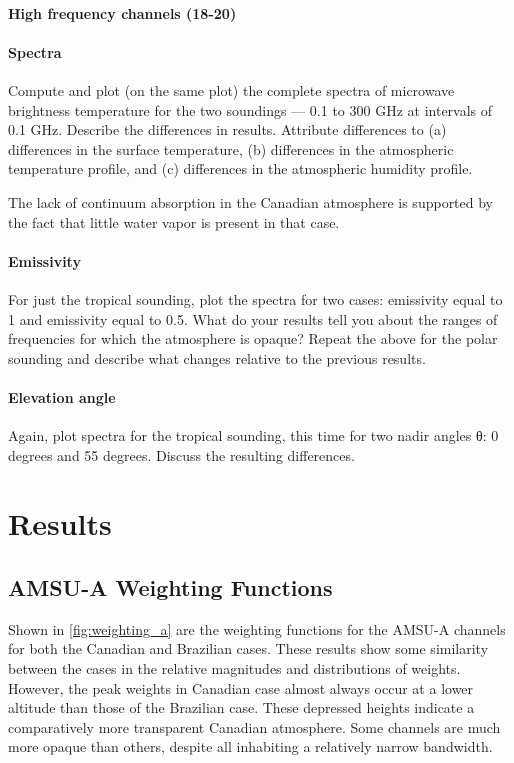 \documentclass[twocol]{ametsoc}
\begin{document}
\paragraph{High frequency channels (18-20)}


\paragraph{Spectra}
Compute and plot (on the same plot) the complete spectra of microwave brightness temperature for the two soundings — 0.1 to 300 GHz at intervals of 0.1 GHz.   Describe the differences in results. 
Attribute differences to (a) differences in the surface temperature, (b) differences in the atmospheric temperature profile, and (c) differences in the atmospheric humidity profile.

The lack of continuum absorption in the Canadian atmosphere is supported by the fact that little water vapor is present in that case.

\paragraph{Emissivity}
For just the tropical sounding, plot the spectra for two cases:  emissivity equal to 1  and emissivity equal to 0.5.  What do your results tell you about the ranges of frequencies for which the atmosphere is opaque?
Repeat the above for the polar sounding and describe what changes relative to the previous results.

\paragraph{Elevation angle}
Again, plot spectra for the tropical sounding, this time for two nadir angles θ:  0 degrees and 55 degrees.  Discuss the resulting differences.

\section{Results}

\subsection{AMSU-A Weighting Functions}

Shown in \autoref{fig:weighting_a} are the weighting functions for the AMSU-A channels for both the Canadian and Brazilian cases.
These results show some similarity between the cases in the relative magnitudes and distributions of weights.
However, the peak weights in Canadian case almost always occur at a lower altitude than those of the Brazilian case.
These depressed heights indicate a comparatively more transparent Canadian atmosphere.
Some channels are much more opaque than others, despite all inhabiting a relatively narrow bandwidth.
\end{document}
